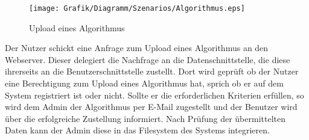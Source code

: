 \begin{figure}[h]
	\centering
	\texttt{[image: Grafik/Diagramm/Szenarios/Algorithmus.eps]}
	\caption[]{Upload eines Algorithmus}
\end{figure}

\noindent Der Nutzer schickt eine Anfrage zum Upload eines Algorithmus an den Webserver. Dieser delegiert die Nachfrage an die Datenschnittstelle, die diese ihrerseits an die Benutzerschnittstelle zustellt. Dort wird geprüft ob der Nutzer eine Berechtigung zum Upload eines Algorithmus hat, sprich ob er auf dem System registriert ist oder nicht. Sollte er die erforderlichen Kriterien erfüllen, so wird dem Admin der Algorithmus per E-Mail zugestellt und der Benutzer wird über die erfolgreiche Zustellung informiert. Nach Prüfung der übermittelten Daten kann der Admin diese in das Filesystem des Systems integrieren.